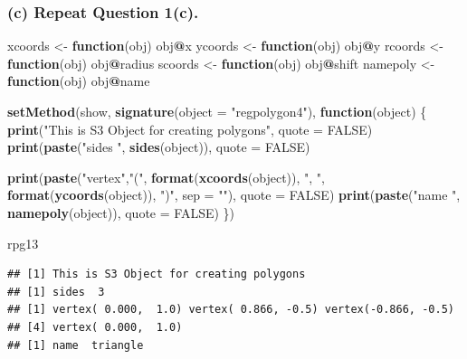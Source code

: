 \documentclass[]{article}
\newenvironment{Shaded}{\begin{snugshade}}{\end{snugshade}}
\newcommand{\KeywordTok}[1]{\textcolor[rgb]{0.13,0.29,0.53}{\textbf{#1}}}
\newcommand{\DataTypeTok}[1]{\textcolor[rgb]{0.13,0.29,0.53}{#1}}
\newcommand{\StringTok}[1]{\textcolor[rgb]{0.31,0.60,0.02}{#1}}
\newcommand{\OtherTok}[1]{\textcolor[rgb]{0.56,0.35,0.01}{#1}}
\newcommand{\ControlFlowTok}[1]{\textcolor[rgb]{0.13,0.29,0.53}{\textbf{#1}}}
\newcommand{\OperatorTok}[1]{\textcolor[rgb]{0.81,0.36,0.00}{\textbf{#1}}}
\newcommand{\NormalTok}[1]{#1}
\begin{document}
\subsubsection{(c) Repeat Question 1(c).}\label{c-repeat-question-1c.}

\begin{Shaded}
\begin{Highlighting}[]
\NormalTok{xcoords <-}\StringTok{ }\ControlFlowTok{function}\NormalTok{(obj) obj}\OperatorTok{@}\NormalTok{x}
\NormalTok{ycoords <-}\StringTok{ }\ControlFlowTok{function}\NormalTok{(obj) obj}\OperatorTok{@}\NormalTok{y}
\NormalTok{rcoords <-}\StringTok{ }\ControlFlowTok{function}\NormalTok{(obj) obj}\OperatorTok{@}\NormalTok{radius}
\NormalTok{scoords <-}\StringTok{ }\ControlFlowTok{function}\NormalTok{(obj) obj}\OperatorTok{@}\NormalTok{shift}
\NormalTok{namepoly <-}\StringTok{ }\ControlFlowTok{function}\NormalTok{(obj) obj}\OperatorTok{@}\NormalTok{name}

\KeywordTok{setMethod}\NormalTok{(show, }\KeywordTok{signature}\NormalTok{(}\DataTypeTok{object =} \StringTok{"regpolygon4"}\NormalTok{), }\ControlFlowTok{function}\NormalTok{(object) \{}
  \KeywordTok{print}\NormalTok{(}\StringTok{"This is S3 Object for creating polygons"}\NormalTok{, }\DataTypeTok{quote =} \OtherTok{FALSE}\NormalTok{)}
  \KeywordTok{print}\NormalTok{(}\KeywordTok{paste}\NormalTok{(}\StringTok{"sides "}\NormalTok{, }\KeywordTok{sides}\NormalTok{(object)), }\DataTypeTok{quote =} \OtherTok{FALSE}\NormalTok{)}
  
  \KeywordTok{print}\NormalTok{(}\KeywordTok{paste}\NormalTok{(}\StringTok{"vertex"}\NormalTok{,}\StringTok{"("}\NormalTok{, }
              \KeywordTok{format}\NormalTok{(}\KeywordTok{xcoords}\NormalTok{(object)), }\StringTok{", "}\NormalTok{, }
              \KeywordTok{format}\NormalTok{(}\KeywordTok{ycoords}\NormalTok{(object)), }\StringTok{")"}\NormalTok{, }\DataTypeTok{sep =} \StringTok{""}\NormalTok{), }
        \DataTypeTok{quote =} \OtherTok{FALSE}\NormalTok{)}
  \KeywordTok{print}\NormalTok{(}\KeywordTok{paste}\NormalTok{(}\StringTok{"name "}\NormalTok{, }\KeywordTok{namepoly}\NormalTok{(object)), }\DataTypeTok{quote =} \OtherTok{FALSE}\NormalTok{)}
\NormalTok{\})}

\NormalTok{rpg13}
\end{Highlighting}
\end{Shaded}

\begin{verbatim}
## [1] This is S3 Object for creating polygons
## [1] sides  3
## [1] vertex( 0.000,  1.0) vertex( 0.866, -0.5) vertex(-0.866, -0.5)
## [4] vertex( 0.000,  1.0)
## [1] name  triangle
\end{verbatim}
\end{document}

